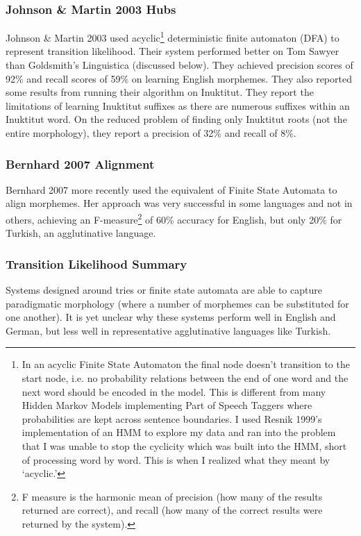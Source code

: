 \documentclass[runningheads,a4paper]{llncs}
\begin{document}
\subsubsection{Johnson \& Martin 2003 Hubs}

Johnson \& Martin 2003 used acyclic\footnote{In an acyclic Finite State Automaton the final node doesn't transition to the start node, i.e. no probability relations between the end of one word and the next word should be encoded in the model. This is different from many Hidden Markov Models implementing Part of Speech Taggers where probabilities are kept across sentence boundaries. I used Resnik 1999's implementation of an HMM to explore my data and ran into the problem that I was unable to stop the cyclicity which was built into the HMM, short of processing word by word. This is when I realized what they meant by `acyclic.'}  deterministic finite automaton (DFA) to represent transition likelihood. Their system performed better on Tom Sawyer than Goldsmith's Linguistica (discussed below). They achieved precision scores of 92\% and recall scores of 59\% on learning English morphemes.  They also reported some results from running their algorithm on Inuktitut. They report the limitations of learning Inuktitut suffixes as there are numerous suffixes within an Inuktitut word. On the reduced problem of finding only Inuktitut roots (not the entire morphology), they report a precision of 32\% and recall of 8\%.

\subsubsection{Bernhard 2007 Alignment}

Bernhard 2007 more recently used the equivalent of Finite State Automata to align morphemes. Her approach was very successful in some languages and not in others, achieving an F-measure\footnote{F measure is the harmonic mean of precision (how many of the results returned are correct), and recall (how many of the correct results were returned by the system).} of 60\% accuracy for English, but only 20\% for Turkish, an agglutinative language. 

\subsubsection{Transition Likelihood Summary}

Systems designed around tries or finite state automata are able to capture paradigmatic morphology (where a number of morphemes can be substituted for one another). It is yet unclear why these systems perform well in English and German, but less well in representative agglutinative languages like Turkish.
\end{document}
